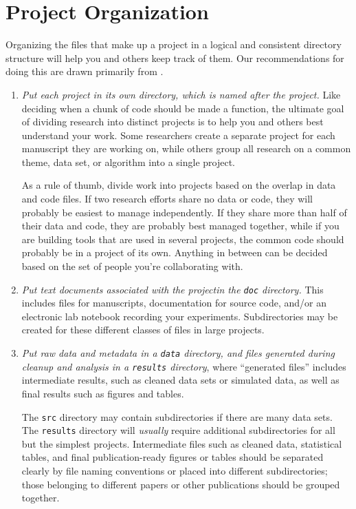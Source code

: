 \documentclass[10pt]{article}
\newcommand{\recommend}[1]{\textit{#1}}
\begin{document}
\section{Project Organization}\label{sec:project}

Organizing the files that make up a project in a logical and
consistent directory structure will help you and others keep track of
them.  Our recommendations for doing this are drawn primarily from
\cite{noble2009,gentzkow2014}.

\begin{enumerate}

\item
  \recommend{Put each project in its own directory, which is named
    after the project.}  Like deciding when a chunk of code should be
  made a function, the ultimate goal of dividing research into
  distinct projects is to help you and others best understand your
  work. Some researchers create a separate project for each manuscript
  they are working on, while others group all research on a common
  theme, data set, or algorithm into a single project.
    
  As a rule of thumb, divide work into projects based on the overlap
  in data and code files. If two research efforts share no data or
  code, they will probably be easiest to manage independently. If they
  share more than half of their data and code, they are probably best
  managed together, while if you are building tools that are used in
  several projects, the common code should probably be in a project of
  its own. Anything in between can be decided based on the set of
  people you're collaborating with.

\item
  \recommend{Put text documents associated with the projectin the
    \texttt{doc} directory.} This includes files for manuscripts,
  documentation for source code, and/or an electronic lab notebook
  recording your experiments.  Subdirectories may be created for these
  different classes of files in large projects.

\item
  \recommend{Put raw data and metadata in a \texttt{data} directory,
    and files generated during cleanup and analysis in a
    \texttt{results} directory}, where ``generated files'' includes
  intermediate results, such as cleaned data sets or simulated data,
  as well as final results such as figures and tables.

  The \texttt{src} directory may contain subdirectories if there are
  many data sets.  The \texttt{results} directory will \emph{usually}
  require additional subdirectories for all but the simplest
  projects. Intermediate files such as cleaned data, statistical
  tables, and final publication-ready figures or tables should be
  separated clearly by file naming conventions or placed into
  different subdirectories; those belonging to different papers or
  other publications should be grouped together.


\end{enumerate}
\end{document}
